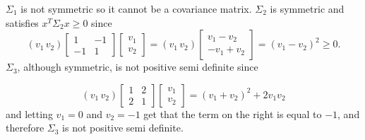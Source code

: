 
$ \Sigma_1$ is not symmetric so it cannot be a covariance matrix. $ \Sigma_2$ is symmetric and
satisfies $ x^{T} \Sigma_2 x \geq 0 $ since 
\[
    (v_1 \, v_2) \begin{bmatrix}
	1 & -1 \\
	-1 & 1
    \end{bmatrix} \begin{bmatrix}
    v_1\\
    v_2
    \end{bmatrix} = (v_1 \, v_2) \begin{bmatrix}
    v_1 - v_2\\
    -v_1 + v_2	    
    \end{bmatrix} = (v_1 - v_2)^2 \geq 0
.\] 
$ \Sigma_3$, although symmetric, is not positive semi
definite since 

\[
    (v_1 \, v_2) \begin{bmatrix}
	1 & 2 \\
	2 & 1
    \end{bmatrix} \begin{bmatrix}
    v_1 \\
    v_2	    
    \end{bmatrix} = (v_1 + v_2)^2 + 2v_1 v_2
\] 
and letting $ v_1 = 0$ and $ v_2 = -1$ get that the term on the right is equal to $ -1$, and
therefore $ \Sigma_3$ is not positive semi definite.
